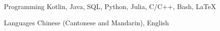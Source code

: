 

\begin{cvskills}

  \cvskill
    {Programming} %
    {Kotlin, Java, SQL, Python, Julia, C/C++, Bash, LaTeX} %

  \cvskill
    {Languages} %
    {Chinese (Cantonese and Mandarin), English} %

\end{cvskills}
